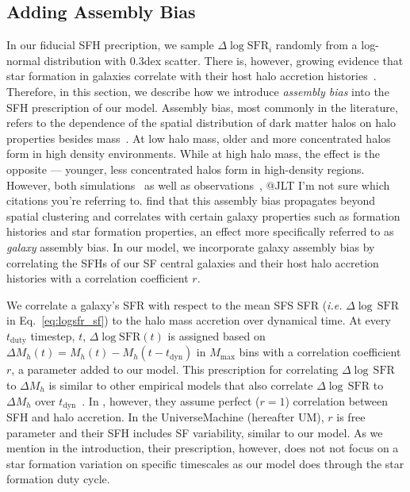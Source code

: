\documentclass[12pt, letterpaper, preprint, tighten]{aastex62}
\newcommand{\ch}[1]{{\color{orange}{\bf CH:} #1}}
\newcommand{\edt}[1]{{\color{dred}{\bf} #1}}
\newcommand{\logsfr}{\log\mathrm{SFR}}
\begin{document}
\subsection{Adding Assembly Bias}
\edt{In our fiducial SFH precription, we sample $\Delta \logsfr_i$ randomly
from a log-normal distribution with $0.3$dex scatter.}
There is, however, growing evidence that star formation in galaxies correlate with their host
halo accretion histories~\citep[\emph{e.g.}][]{lim2016, tojeiro2017, tinker2018b}.
Therefore, in this section, we describe how we introduce \emph{assembly bias}
into the SFH prescription of our model.%
Assembly bias, most commonly in the literature, refers to the dependence of the
spatial distribution of dark matter halos on halo properties besides
mass~\citep{gao2005,wechsler2006,gao2007,wetzel2007,li2008,sunayama2016}.
At low halo mass, older and more concentrated halos form in high density environments.
While at high halo mass, the effect is the opposite --- younger, less concentrated
halos form in high-density regions. However, both
simulations~\citep{croton2007, artale2018, zehavi2018} as well as
observations~\citep{yang2006,wang2008,tinker2011,wang2013,lacerna2014,calderon2018,tinker2018},
\ch{@JLT I'm not sure which citations you're referring to.}
find that this assembly bias propagates beyond spatial clustering and correlates
with \edt{certain} galaxy properties such as formation histories and star formation
properties, an effect more specifically referred to as {\em galaxy} assembly bias.
In our model, we incorporate galaxy assembly bias by correlating the SFHs
of our SF central galaxies and their host halo accretion histories
with a correlation coefficient $r$.

We correlate a galaxy's SFR with respect to the mean SFS SFR
(\emph{i.e.} $\Delta\log\,\mathrm{SFR}$ in Eq.~\ref{eq:logsfr_sf}) to the
halo mass accretion over dynamical time. At every $t_\mathrm{duty}$ timestep,
$t$, $\Delta\logsfr(t)$ is assigned based on
$\Delta M_h(t) = M_h(t) - M_h(t - t_\mathrm{dyn})$ in $M_\mathrm{max}$ bins
with a correlation coefficient $r$, a parameter added to our model. This
prescription for correlating $\Delta\log\,\mathrm{SFR}$ to $\Delta M_h$ is
similar to other empirical models that also correlate $\Delta\log\,\mathrm{SFR}$
to $\Delta M_h$ over $t_\mathrm{dyn}$~\citep{rodriguez-puebla2016a, behroozi2018}.
In \cite{rodriguez-puebla2016a}, however, they assume perfect ($r=1$) correlation
between SFH and halo accretion. In the \cite{behroozi2018} {\sc UniverseMachine}
(hereafter UM), $r$ is free parameter and their SFH includes SF variability,
similar to our model. As we mention in the introduction, their prescription,
however, does not not focus on a star formation variation on specific timescales as our model does through
the star formation duty cycle.
\end{document}
